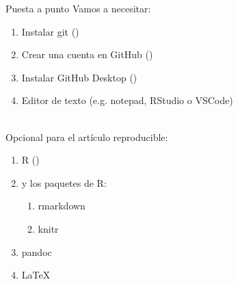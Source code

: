 \documentclass{beamer}
\begin{document}
\begin{frame}{Puesta a punto}
    Vamos a necesitar: 
    \begin{enumerate}
        \item Instalar git (\href{https://git-scm.com/downloads}{\color{blue}{https://git-scm.com/downloads}})
        \item Crear una cuenta en GitHub (\href{https://github.com/}{\color{blue}{https://github.com/}})
        \item Instalar GitHub Desktop (\href{https://desktop.github.com/download/}{\color{blue}{https://desktop.github.com/download/}})
        \item Editor de texto (e.g. notepad, RStudio o VSCode) \\~\\
    \end{enumerate}
    Opcional para el artículo reproducible: 
    \begin{enumerate}
        \item R (\href{https://cran.r-project.org/}{\color{blue}{https://cran.r-project.org/}})
        \item y los paquetes de R:
        \begin{enumerate}
            \item rmarkdown 
            \item knitr
        \end{enumerate} 
        \item pandoc
        \item \LaTeX
    \end{enumerate}
\end{frame}
\end{document}
